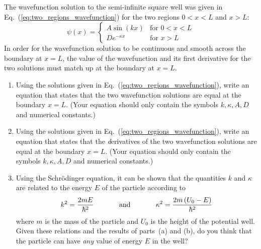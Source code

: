 
\begin{problem}
The wavefunction solution to the semi-infinite square well was given in
Eq.~(\ref{eq:two_regions_wavefunction}) for the two regions $0 < x < L$ and $x > L$:
\begin{equation}
\psi(x) =  \left\{\begin{array}{ll} 
                 A \sin(kx)       & \mbox{for $0 < x <  L$} \\ 
                 D e^{- \kappa x} & \mbox{for $x > L$} 
                \end{array} \right.
\end{equation}
In order for the wavefunction solution to be continuous and smooth across
the boundary at $x = L$, the value of the wavefunction and its first derivative
for the two solutions must match up at the boundary at $x = L$.

\begin{enumerate}

\item Using the solutions given in
Eq.~(\ref{eq:two_regions_wavefunction}), write an equation that states
that the two wavefunction solutions are equal at the boundary $x = L$.
(Your equation should only contain the symbols $k, \kappa, A, D$ and
numerical constants.)

\item Using the solutions given in
Eq.~(\ref{eq:two_regions_wavefunction}), write an equation that states
that the {\emph derivatives} of the two wavefunction solutions are equal
at the boundary $x = L$.  (Your equation should only contain the symbols
$k, \kappa, A, D$ and numerical constants.)

\item Using the Schr\"{o}dinger equation, it can be shown that the
quantities $k$ and $\kappa$ are related to the energy $E$ of the particle
according to
\begin{equation}
k^2 = \frac{2 m E}{\hbar^2} \hspace{0.5in} 
\mbox{and} \hspace{0.5in} \kappa^2 = \frac{2m \left( U_0 - E \right)}{\hbar^2}
\end{equation}
where $m$ is the mass of the particle and $U_0$ is the height of the
potential well.  Given these relations and the results of parts~(a) and
(b), do you think that the particle can have \emph{any} value of energy
$E$ in the well?  
\end{enumerate} 
\end{problem}

